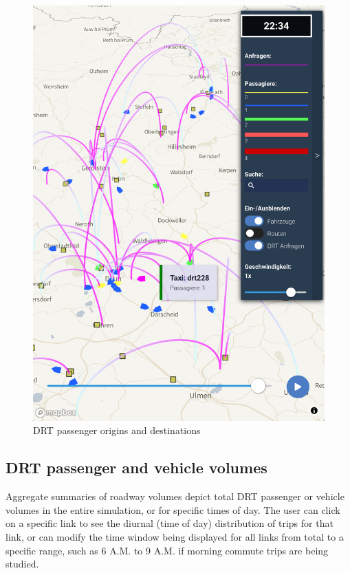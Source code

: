 \begin{figure}[ht]
\begin{minipage}[c]{0.45\textwidth}
   \includegraphics[width=\linewidth]{chapters/22-avov/images/fig-drt-flyovers.png}
   \caption{DRT passenger origins and destinations}
   \label{fig:avov-drt-od}
\end{minipage}
\end{figure}

\subsection{DRT passenger and vehicle volumes}
\label{avov-volumes}

Aggregate summaries of roadway volumes depict total DRT passenger or vehicle volumes in the entire simulation, or for specific times of day. The user can click on a specific link to see the diurnal (time of day) distribution of trips for that link, or can modify the time window being displayed for all links from total to a specific range, such as 6 A.M. to 9 A.M. if morning commute trips are being studied.


